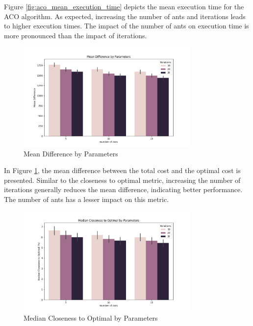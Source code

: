 \documentclass[
]{article}
\begin{document}
    Figure \ref{fig:aco_mean_execution_time} depicts the mean execution time for the ACO algorithm. As expected, increasing the number of ants and iterations leads to higher execution times. The impact of the number of ants on execution time is more pronounced than the impact of iterations.

    \begin{figure}[H]
        \centering
        \includegraphics[width=0.8\textwidth]{./aco/aco_mean_difference.png}
        \caption{Mean Difference by Parameters}
        \label{fig:aco_mean_difference}
    \end{figure}

    In Figure \ref{fig:aco_mean_difference}, the mean difference between the total cost and the optimal cost is presented. Similar to the closeness to optimal metric, increasing the number of iterations generally reduces the mean difference, indicating better performance. The number of ants has a lesser impact on this metric.

    \begin{figure}[H]
        \centering
        \includegraphics[width=0.8\textwidth]{./aco/aco_median_closeness_to_optimal.png}
        \caption{Median Closeness to Optimal by Parameters}
        \label{fig:aco_median_closeness_to_optimal}
    \end{figure}
\end{document}

